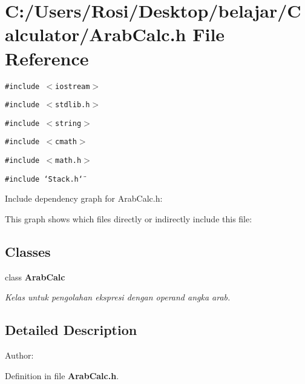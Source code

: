 \section{C:/Users/Rosi/Desktop/belajar/Calculator/Arab\-Calc.h File Reference}
\label{_arab_calc_8h}
{\tt \#include $<$iostream$>$}\par
{\tt \#include $<$stdlib.h$>$}\par
{\tt \#include $<$string$>$}\par
{\tt \#include $<$cmath$>$}\par
{\tt \#include $<$math.h$>$}\par
{\tt \#include \char`\"{}Stack.h\char`\"{}}\par


Include dependency graph for Arab\-Calc.h:

This graph shows which files directly or indirectly include this file:\subsection*{Classes}
\begin{CompactItemize}
\item 
class {\bf Arab\-Calc}
\begin{CompactList}\small\item\em Kelas untuk pengolahan ekspresi dengan operand angka arab. \item\end{CompactList}\end{CompactItemize}


\subsection{Detailed Description}
\begin{Desc}
\item[Author:]\end{Desc}


Definition in file {\bf Arab\-Calc.h}.